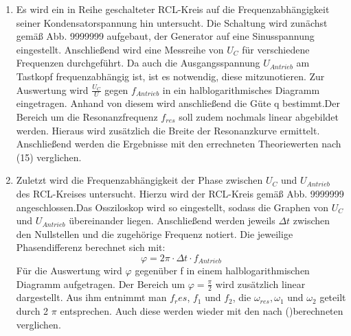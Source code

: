 \begin{enumerate}
      \item Es wird ein in Reihe geschalteter RCL-Kreis auf die Frequenzabhängigkeit seiner Kondensatorspannung hin untersucht.
      Die Schaltung wird zunächst gemäß Abb. 9999999 aufgebaut, der Generator auf eine Sinusspannung eingestellt.
      Anschließend wird eine Messreihe von $U_C$ für verschiedene Frequenzen durchgeführt.
       Da auch die Ausgangsspannung $U_{Antrieb}$ am Tastkopf frequenzabhängig ist, ist es notwendig, diese mitzunotieren.
       Zur Auswertung wird $\frac{U_C}{U}$ gegen $f_{Antrieb}$ in ein halblogarithmisches Diagramm eingetragen. Anhand von diesem wird
        anschließend die Güte q bestimmt.Der Bereich um die Resonanzfrequenz $f_{res}$ soll zudem nochmals linear
         abgebildet werden. Hieraus wird zusätzlich die Breite der Resonanzkurve ermittelt.
         Anschließend werden die Ergebnisse mit den errechneten Theoriewerten nach (15) verglichen.

         \item Zuletzt wird die Frequenzabhängigkeit der Phase zwischen $U_C$ und $U_{Antrieb}$ des
          RCL-Kreises untersucht. Hierzu wird der RCL-Kreis gemäß Abb. 9999999
          angeschlossen.Das Ossziloskop wird so eingestellt, sodass die Graphen von $U_C$ und $U_{Antrieb}$ übereinander liegen.
             Anschließend werden jeweils
      $\Delta t$ zwischen den Nullstellen und die zugehörige Frequenz notiert. Die jeweilige
       Phasendifferenz berechnet sich mit:
       \begin{equation}
         \varphi = 2 \pi \cdot \Delta t \cdot f_{Antrieb}
       \end{equation}
       Für die Auswertung wird $\varphi$ gegenüber f in einem halblogarithmischen
        Diagramm aufgetragen. Der Bereich um $\varphi = \frac{\pi}{2}$ wird zusätzlich
         linear dargestellt. Aus ihm entnimmt man $f_res$, $f_1$ und $f_2$,
          die $\omega_{res},\omega_1$ und $\omega_2$ geteilt durch 2 $\pi$ entsprechen.
           Auch diese werden wieder
         mit den nach ()berechneten verglichen.
\end{enumerate}
